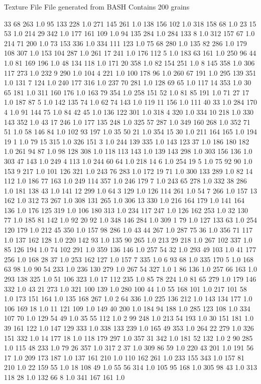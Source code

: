 Texture File
File generated from BASH
Contains 200 grains

33 68 263 1.0
95 133 228 1.0
271 145 261 1.0
138 156 102 1.0
318 158 68 1.0
23 15 53 1.0
214 29 342 1.0
177 161 109 1.0
94 135 284 1.0
284 133 8 1.0
312 157 67 1.0
214 71 200 1.0
73 153 336 1.0
334 111 123 1.0
75 68 280 1.0
135 82 286 1.0
179 108 307 1.0
153 104 287 1.0
261 17 241 1.0
176 112 5 1.0
183 63 161 1.0
250 96 44 1.0
81 169 196 1.0
48 134 118 1.0
171 20 358 1.0
82 154 251 1.0
8 145 358 1.0
306 117 273 1.0
232 9 290 1.0
104 4 221 1.0
100 178 96 1.0
260 67 191 1.0
295 139 351 1.0
131 7 124 1.0
240 177 316 1.0
237 70 281 1.0
128 69 65 1.0
117 14 353 1.0
30 65 181 1.0
311 160 176 1.0
163 79 354 1.0
258 151 52 1.0
81 85 191 1.0
71 27 17 1.0
187 87 5 1.0
142 135 74 1.0
62 74 143 1.0
119 11 156 1.0
111 40 33 1.0
284 170 4 1.0
91 144 75 1.0
84 42 45 1.0
136 122 301 1.0
318 4 320 1.0
334 10 218 1.0
330 143 352 1.0
43 17 246 1.0
177 135 248 1.0
325 57 287 1.0
349 160 268 1.0
352 71 51 1.0
58 146 84 1.0
102 93 197 1.0
35 50 21 1.0
354 15 30 1.0
211 164 165 1.0
194 19 1 1.0
79 15 315 1.0
326 151 3 1.0
244 139 335 1.0
143 123 37 1.0
186 180 182 1.0
261 94 87 1.0
98 128 308 1.0
118 113 143 1.0
139 143 298 1.0
303 156 136 1.0
303 47 143 1.0
249 4 113 1.0
244 60 64 1.0
218 14 6 1.0
254 19 5 1.0
75 92 90 1.0
153 9 217 1.0
101 126 321 1.0
243 76 283 1.0
172 19 71 1.0
300 133 289 1.0
82 14 112 1.0
186 77 163 1.0
249 114 357 1.0
246 179 7 1.0
243 65 278 1.0
332 38 286 1.0
181 138 43 1.0
141 12 299 1.0
64 3 129 1.0
126 114 261 1.0
54 7 266 1.0
157 13 162 1.0
312 73 267 1.0
308 131 265 1.0
306 13 330 1.0
216 164 179 1.0
141 164 136 1.0
176 125 319 1.0
106 180 313 1.0
234 117 247 1.0
126 162 253 1.0
32 130 77 1.0
185 81 142 1.0
92 20 92 1.0
348 146 284 1.0
309 1 79 1.0
127 133 63 1.0
254 120 179 1.0
212 45 350 1.0
157 98 286 1.0
43 44 267 1.0
287 75 36 1.0
356 71 117 1.0
137 162 128 1.0
220 142 93 1.0
135 90 265 1.0
213 29 218 1.0
267 102 337 1.0
85 126 194 1.0
74 102 291 1.0
359 136 146 1.0
257 54 32 1.0
293 49 103 1.0
41 177 256 1.0
168 28 37 1.0
253 162 127 1.0
157 7 335 1.0
6 93 68 1.0
335 170 5 1.0
168 63 98 1.0
90 54 233 1.0
236 130 279 1.0
267 54 327 1.0
1 86 136 1.0
257 66 163 1.0
293 138 325 1.0
51 106 323 1.0
17 112 235 1.0
85 78 224 1.0
81 65 279 1.0
179 146 332 1.0
43 21 273 1.0
321 100 139 1.0
280 100 44 1.0
55 168 101 1.0
217 101 58 1.0
173 151 164 1.0
135 168 267 1.0
2 64 336 1.0
225 136 212 1.0
143 134 177 1.0
106 169 18 1.0
11 121 109 1.0
149 40 200 1.0
184 94 188 1.0
285 123 108 1.0
334 107 70 1.0
129 54 49 1.0
35 55 112 1.0
2 99 248 1.0
213 54 193 1.0
30 151 181 1.0
39 161 122 1.0
147 129 333 1.0
338 133 239 1.0
165 49 353 1.0
264 22 279 1.0
326 151 332 1.0
14 177 18 1.0
118 179 297 1.0
357 31 342 1.0
181 52 132 1.0
2 90 285 1.0
115 48 233 1.0
79 26 357 1.0
317 2 37 1.0
309 86 59 1.0
220 43 201 1.0
191 56 17 1.0
209 173 187 1.0
137 161 210 1.0
110 162 261 1.0
233 155 343 1.0
157 81 210 1.0
22 159 55 1.0
18 108 49 1.0
55 56 314 1.0
105 95 168 1.0
305 98 43 1.0
313 118 28 1.0
132 66 8 1.0
341 167 161 1.0
